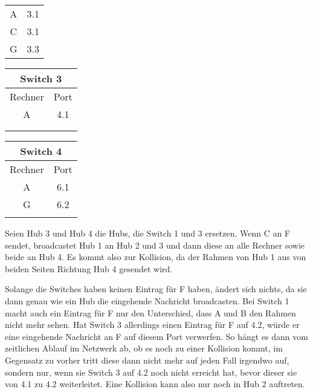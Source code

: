 \documentclass{../exercisesheet}
\begin{document}
\begin{exercise}{4}
\begin{subexercise}
\begin{enumerate}
\begin{center}
\begin{tabular}{c|c}
\hline
A & 3.1 \\
C & 3.1 \\
G & 3.3 \\
\end{tabular}
\begin{tabular}{c|c}
\multicolumn{2}{c}{Switch 3}\\
\hline
Rechner & Port\\
\hline
A & 4.1 \\
  &  \\
  &   \\
\end{tabular}
\begin{tabular}{c|c}
\multicolumn{2}{c}{Switch 4}\\
\hline
Rechner & Port\\
\hline
A & 6.1 \\
G & 6.2 \\
  &   \\
\end{tabular}
\end{center}
\end{enumerate}
\end{subexercise}
\begin{subexercise}
Seien Hub 3 und Hub 4 die Hubs, die Switch 1 und 3 ersetzen. Wenn C an F sendet, broadcastet Hub 1 an Hub 2 und 3 und dann diese an alle Rechner sowie beide an Hub 4. Es kommt also zur Kollision, da der Rahmen von Hub 1 aus von beiden Seiten Richtung Hub 4 gesendet wird.
\end{subexercise}
\begin{subexercise}
Solange die Switches haben keinen Eintrag für F haben, ändert sich nichts, da sie dann genau wie ein Hub die eingehende Nachricht broadcasten. Bei Switch 1 macht auch ein Eintrag für F nur den Unterschied, dass A und B den Rahmen nicht mehr sehen. Hat Switch 3 allerdings einen Eintrag für F auf 4.2, würde er eine eingehende Nachricht an F auf diesem Port verwerfen. So hängt es dann vom zeitlichen Ablauf im Netzwerk ab, ob es noch zu einer Kollision kommt, im Gegensatz zu vorher tritt diese dann nicht mehr auf jeden Fall irgendwo auf, sondern nur, wenn sie Switch 3 auf 4.2 noch nicht erreicht hat, bevor dieser sie von 4.1 zu 4.2 weiterleitet. Eine Kollision kann also nur noch in Hub 2 auftreten.
\end{subexercise}
\end{exercise}
\end{document}
